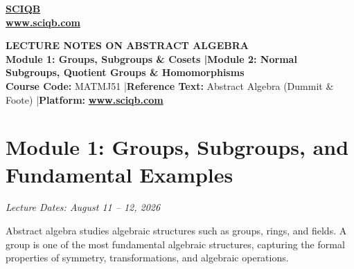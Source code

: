 \documentclass[11pt,a4paper]{article}
\begin{document}
\begin{center}
    \begin{tcolorbox}[boxrule=1.6pt, top=3.5mm, bottom=3.5mm]
        \begin{center}
            {\Huge \bfseries \href{https://www.sciqb.com}{\color{white}SCIQB}}\\[5pt]
            {\large \href{https://www.sciqb.com}{\color{warmgold}\textbf{www.sciqb.com}}} \quad {\color{white}--} 
        \end{center}
    \end{tcolorbox}
\end{center}

\begin{center}
    \begin{tcolorbox}[sharp corners, boxrule=1.5pt]
        \begin{center}
            {\Large \bfseries \color{primarynavy} LECTURE NOTES ON ABSTRACT ALGEBRA}\\[4pt]
            {\large \bfseries \color{secondaryteal} Module 1: Groups, Subgroups \& Cosets \quad|\quad Module 2: Normal Subgroups, Quotient Groups \& Homomorphisms}\\[6pt]
            {\small \textbf{Course Code:} MATMJ51 \quad|\quad \textbf{Reference Text:} Abstract Algebra (Dummit \& Foote) \quad|\quad \textbf{Platform:} \href{https://www.sciqb.com}{\color{accentblue}\textbf{www.sciqb.com}}}
        \end{center}
    \end{tcolorbox}
\end{center}

\vspace{0.3cm}

\tableofcontents
\newpage

\section{Module 1: Groups, Subgroups, and Fundamental Examples}
\textit{Lecture Dates: August 11 -- 12, 2026}

Abstract algebra studies algebraic structures such as groups, rings, and fields. A group is one of the most fundamental algebraic structures, capturing the formal properties of symmetry, transformations, and algebraic operations.
\end{document}
